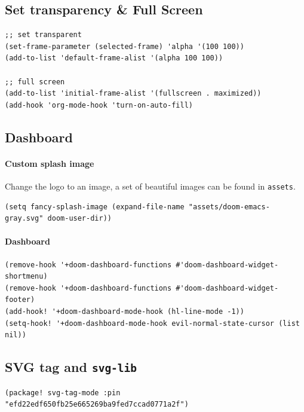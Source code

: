 \documentclass[11pt]{article}
\begin{document}
\subsection{Set transparency \& Full Screen}
\label{sec:orga23a5d6}

\begin{verbatim}
;; set transparent
(set-frame-parameter (selected-frame) 'alpha '(100 100))
(add-to-list 'default-frame-alist '(alpha 100 100))

;; full screen
(add-to-list 'initial-frame-alist '(fullscreen . maximized))
(add-hook 'org-mode-hook 'turn-on-auto-fill)
\end{verbatim}

\subsection{Dashboard}
\label{sec:org31035bc}
\paragraph{Custom splash image}
\label{sec:org9127e15}
Change the logo to an image, a set of beautiful images can be found in \texttt{assets}.

\begin{verbatim}
(setq fancy-splash-image (expand-file-name "assets/doom-emacs-gray.svg" doom-user-dir))
\end{verbatim}

\paragraph{Dashboard}
\label{sec:org1dc4fc0}

\begin{verbatim}
(remove-hook '+doom-dashboard-functions #'doom-dashboard-widget-shortmenu)
(remove-hook '+doom-dashboard-functions #'doom-dashboard-widget-footer)
(add-hook! '+doom-dashboard-mode-hook (hl-line-mode -1))
(setq-hook! '+doom-dashboard-mode-hook evil-normal-state-cursor (list nil))
\end{verbatim}

\subsection{SVG tag and \texttt{svg-lib}}
\label{sec:orgc49fcd6}

\begin{verbatim}
(package! svg-tag-mode :pin "efd22edf650fb25e665269ba9fed7ccad0771a2f")
\end{verbatim}
\end{document}
